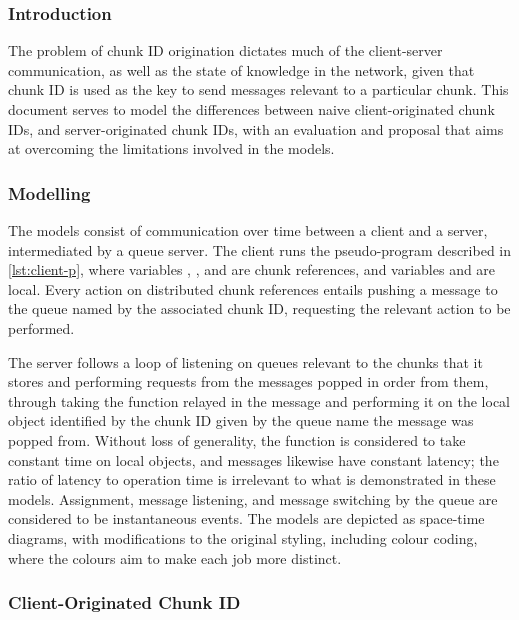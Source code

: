 \subsubsection{Introduction}

The problem of chunk ID origination dictates much of the client-server communication, as well as the state of knowledge in the network, given that chunk ID is used as the key to send messages relevant to a particular chunk.
This document serves to model the differences between naive client-originated chunk IDs, and server-originated chunk IDs, with an evaluation and proposal that aims at overcoming the limitations involved in the models.

\subsubsection{Modelling}\label{sec:cid-model}

The models consist of communication over time between a client and a server, intermediated by a queue server.
The client runs the pseudo-program described in \cref{lst:client-p}, where variables , , and  are chunk references, and variables  and  are local.
Every action on distributed chunk references entails pushing a  message to the queue named by the associated chunk ID, requesting the relevant action to be performed.


The server follows a loop of listening on queues relevant to the chunks that it stores and performing requests from the messages popped in order from them, through taking the function relayed in the message and performing it on the local object identified by the chunk ID given by the queue name the message was popped from.
Without loss of generality, the function  is considered to take constant time on local objects, and messages likewise have constant latency; the ratio of latency to operation time is irrelevant to what is demonstrated in these models.
Assignment, message listening, and message switching by the queue are considered to be instantaneous events.
The models are depicted as space-time diagrams, with modifications to the original styling\cite{lamport1978ordering}, including colour coding, where the colours aim to make each job more distinct.

\subsubsection{Client-Originated Chunk ID}


